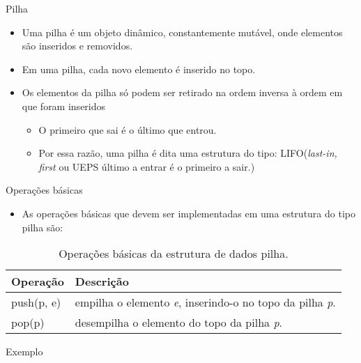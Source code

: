    \begin{frame}{Pilha}     
			\begin{itemize}
				\item Uma pilha é um objeto dinâmico, constantemente mutável, onde elementos são inseridos e removidos.
				\item Em uma pilha, cada novo elemento é inserido no topo.
				\item Os elementos da pilha só podem ser retirado na ordem inversa à ordem em que foram inseridos				
					\begin{itemize}
						\item O primeiro que sai é o último que entrou.
						\item Por essa razão, uma pilha é dita uma estrutura do tipo: \alert{LIFO}(\textit{last-in, first} ou UEPS último a entrar é o primeiro a sair.)
					\end{itemize}
			\end{itemize}
  \end{frame}
  
   \begin{frame}{Operações básicas}     
			\begin{itemize}
				\item As operações básicas que devem ser implementadas em uma estrutura do tipo pilha são:
			\end{itemize}
			\begin{table}[ht]
			  \centering
						\begin{tabular}{l|l}
						    \hline \textbf{Operação} & \textbf{Descrição} \\
						    \hline push(p, e) & empilha o elemento \textit{e}, inserindo-o no topo da pilha \textit{p}.\\
						    \hline pop(p) & desempilha o elemento do topo da pilha \textit{p}.\\
						    \hline 
						\end{tabular}
						\caption{Operações básicas da estrutura de dados pilha.}
				\end{table}
  \end{frame}
  
   \begin{frame}{Exemplo} 
		   	\begin{figure}[ht]
				\centering
			\end{figure} 
   \end{frame}
  
